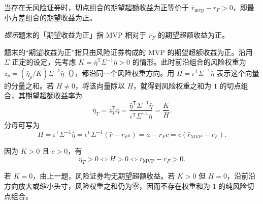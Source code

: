 \par\noindent\begin{minipage}{\linewidth}
\begin{problem}
 当存在无风险证券时，切点组合的期望超额收益为正等价于 $\bar{r}_{\mathrm{mvp}}-r_{F}>0$，即最小方差组合的期望收益为正。
\par\textit{提示}\quad 题末的「期望收益为正」指 MVP 相对于 $r_F$ 的期望超额收益为正。
\end{problem}
\end{minipage}\par
{}
\begin{solution}[label-content={证明}]
题末的“期望收益为正”指只由风险证券构成的 MVP 的期望超额收益为正。沿用 $\Sigma$ 正定的设定，先考虑 $K=\bar\eta^{\mathsf T}\Sigma^{-1}\bar\eta>0$ 的情形。此时前沿组合的风险权重为 $z_p=(\bar\eta_p/K)\Sigma^{-1}\bar\eta$\ifdefined\WJHandoutKnowledge（）\fi，都沿同一个风险权重方向。用 $H=\iota^{\mathsf T}\Sigma^{-1}\bar\eta$ 表示这个向量的分量之和。若 $H\ne0$，将该向量除以 $H$，就得到风险权重之和为 $1$ 的切点组合，其期望超额收益率为
\[
 \bar\eta_T=z_T^{\mathsf T}\bar\eta
 =\frac{\bar\eta^{\mathsf T}\Sigma^{-1}\bar\eta}{\iota^{\mathsf T}\Sigma^{-1}\bar\eta}
 =\frac{K}{H}.
\]
分母可写为
\[
 H=\iota^{\mathsf T}\Sigma^{-1}\bar\eta
 =\iota^{\mathsf T}\Sigma^{-1}(\bar r-r_F\iota)
 =a-r_Fc=c(\bar r_{\mathrm{MVP}}-r_F).
\]

因为 $K>0$ 且 $c>0$，有
\[
 \boxed{\bar\eta_T>0\iff H>0
 \iff \bar r_{\mathrm{MVP}}-r_F>0}.
\]

若 $K=0$，由上一题，风险证券均无期望超额收益。若 $K>0$ 但 $H=0$，沿前沿方向放大或缩小头寸，风险权重之和仍为零，因而不存在权重和为 $1$ 的纯风险切点组合。
\end{solution}

